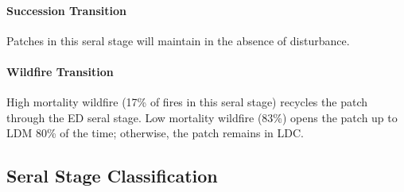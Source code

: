 \paragraph*{Succession Transition} Patches in this seral stage will maintain in the absence of disturbance.

\paragraph*{Wildfire Transition} High mortality wildfire (17\% of fires in this seral stage) recycles the patch through the ED seral stage. Low mortality wildfire (83\%) opens the patch up to LDM 80\% of the time; otherwise, the patch remains in LDC.

\noindent\hrulefill




\subsection*{Seral Stage Classification}
